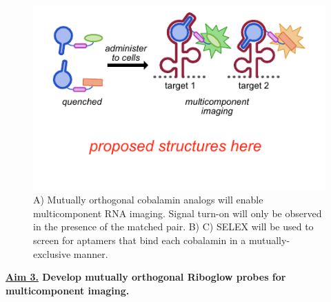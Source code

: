 \begin{figure}
\begin{centering}
\includegraphics[width=\textwidth]{figures/fig3.pdf}

\end{centering}
\footnotesize
\caption{\label{figure:multicomponent}
A) Mutually orthogonal cobalamin analogs will enable multicomponent RNA imaging. Signal turn-on will only be observed in the presence of the matched pair. B) C) SELEX will be used to screen for aptamers that bind each cobalamin in a mutually-exclusive manner.
}
\end{figure}

\textbf{\underline{Aim 3.} Develop mutually orthogonal Riboglow probes for multicomponent imaging.}\\

